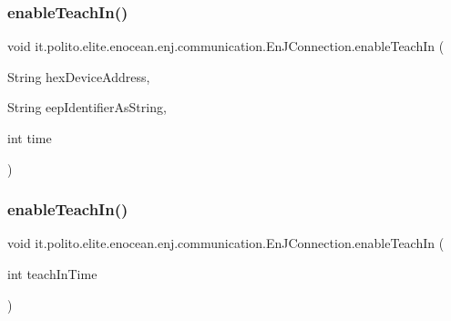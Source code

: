 \hypertarget{classit_1_1polito_1_1elite_1_1enocean_1_1enj_1_1communication_1_1_en_j_connection_acbb95c1e5e75cd5abdbe569400667a2a}{}\label{classit_1_1polito_1_1elite_1_1enocean_1_1enj_1_1communication_1_1_en_j_connection_acbb95c1e5e75cd5abdbe569400667a2a} 
\subsubsection{\texorpdfstring{enable\+Teach\+In()}{enableTeachIn()}\hspace{0.1cm}{\footnotesize\ttfamily [3/4]}}
{\footnotesize\ttfamily void it.\+polito.\+elite.\+enocean.\+enj.\+communication.\+En\+J\+Connection.\+enable\+Teach\+In (\begin{DoxyParamCaption}\item[{String}]{hex\+Device\+Address,  }\item[{String}]{eep\+Identifier\+As\+String,  }\item[{int}]{time }\end{DoxyParamCaption})}

\hypertarget{classit_1_1polito_1_1elite_1_1enocean_1_1enj_1_1communication_1_1_en_j_connection_a2d2c099a22e34a75ad6fa5123280f90f}{}\label{classit_1_1polito_1_1elite_1_1enocean_1_1enj_1_1communication_1_1_en_j_connection_a2d2c099a22e34a75ad6fa5123280f90f} 
\subsubsection{\texorpdfstring{enable\+Teach\+In()}{enableTeachIn()}\hspace{0.1cm}{\footnotesize\ttfamily [4/4]}}
{\footnotesize\ttfamily void it.\+polito.\+elite.\+enocean.\+enj.\+communication.\+En\+J\+Connection.\+enable\+Teach\+In (\begin{DoxyParamCaption}\item[{int}]{teach\+In\+Time }\end{DoxyParamCaption})}

